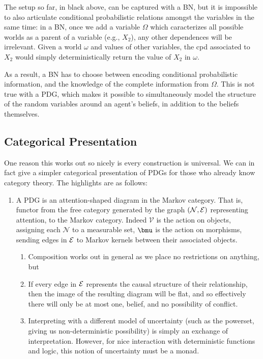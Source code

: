 {\begin{example}
\begin{center}
{}
	\end{center}
	The setup so far, in black above, can be captured with a BN, but it is impossible to also articulate conditional probabilistic relations amongst the variables in the same time: in a BN, once we add a variable $\Omega$ which caracterizes all possible worlds as a parent of a variable (e.g., $X_2$), any other dependences will be irrelevant. Given a world $\omega$ and values of other variables, the cpd associated to $X_2$ would simply deterministically return the value of $X_2$ in $\omega$. 
	
	As a result, a BN has to choose between encoding conditional probabilistic information, and the knowledge of the complete information from $\Omega$. This is not true with a PDG, which makes it possible to simultaneously model the structure of the random variables around an agent's beliefs, in addition to the beliefs themselves.
\end{example}


\begin{vcat}
	\section{Categorical Presentation}
	One reason this works out so nicely is every construction is universal. We can in fact give a simpler categorical presentation of PDGs for those who already know category theory. The highlights are as follows:
	\begin{enumerate}
		\item A PDG is an attention-shaped diagram in the Markov category. That is, functor from the free category generated by the graph $(\mathcal N, \mathcal E)$ representing attention, to the Markov category. Indeed $\mathcal V$ is the action on objects, assigning each $\mathcal N$ to a measurable set, $\bmu$ is the action on morphisms, sending edges in $\mathcal E$ to Markov kernels between their associated objects. 
		\begin{enumerate}
			\item Composition works out in general as we place no restrictions on anything, but
			\item If every edge in $\mathcal E$ represents the causal structure of their relationship, then the image of the resulting diagram will be flat, and so effectively there will only be at most one, belief, and no possibility of conflict.
			\item Interpreting with a different model of uncertainty (such as the powerset, giving us non-deterministic possibility) is simply an exchange of interpretation. However, for nice interaction with deterministic functions and logic, this notion of uncertainty must be a monad.
		\end{enumerate}
		

\end{enumerate}
\end{vcat}}

